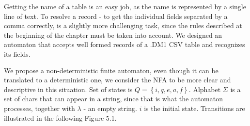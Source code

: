 Getting the name of a table is an easy job, as the name is represented by a single line of text. 
To resolve a record - to get the individual fields separated by a comma correctly, is a slightly more challenging task, since the rules described at the beginning of the chapter must be taken into account.
We designed an automaton that accepts well formed records of a .DM1 CSV table and recognizes its fields.

We propose a non-deterministic finite automaton, even though it can be translated to a deterministic one, we consider the NFA to be more clear and descriptive in this situation.
Set of states is $Q = \left\{i, q, e, a, f\right\}$.
Alphabet $\Sigma$ is a set of chars that can appear in a string, since that is what the automaton processes, together with $\lambda$ - an empty string.
$i$ is the initial state.
Transitions are illustrated in the following Figure 5.1.

